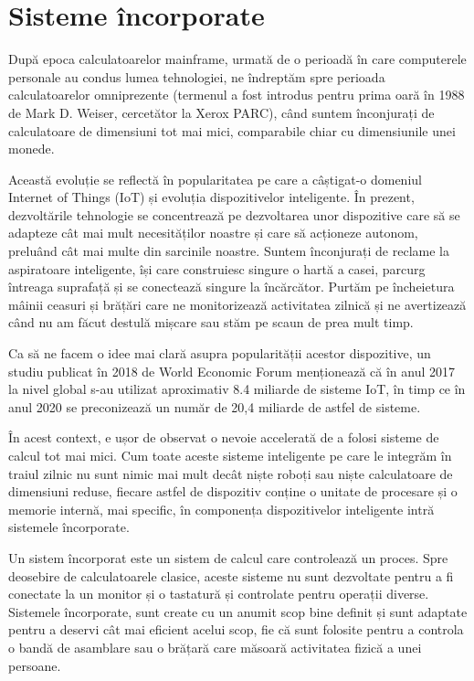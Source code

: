 \chapter{Sisteme încorporate}
\label{chapter:embed}

După epoca calculatoarelor mainframe, urmată de o perioadă în care computerele
personale au condus lumea tehnologiei, ne îndreptăm spre perioada
calculatoarelor omniprezente (termenul a fost introdus pentru prima oară în 1988
de Mark D. Weiser, cercetător la Xerox PARC), când suntem înconjurați de
calculatoare de dimensiuni tot mai mici, comparabile chiar cu dimensiunile unei
monede.

Această evoluție se reflectă în popularitatea pe care a câștigat-o domeniul
Internet of Things (IoT) și evoluția dispozitivelor inteligente. În prezent,
dezvoltările tehnologie se concentrează pe dezvoltarea unor dispozitive care să
se adapteze cât mai mult necesităților noastre și care să acționeze autonom,
preluând cât mai multe din sarcinile noastre. Suntem înconjurați de reclame la
aspiratoare inteligente, își care construiesc singure o hartă a casei, parcurg
întreaga suprafață și se conectează singure la încărcător. Purtăm pe încheietura
mâinii ceasuri și brățări care ne monitorizează activitatea zilnică și ne
avertizează când nu am făcut destulă mișcare sau stăm pe scaun de prea mult
timp.

Ca să ne facem o idee mai clară asupra popularității acestor dispozitive, un
studiu publicat în 2018 de World Economic Forum menționează că în anul 2017 la
nivel global s-au utilizat aproximativ 8.4 miliarde de sisteme IoT, în timp ce
în anul 2020 se preconizează un număr de 20,4 miliarde de astfel de sisteme.

În acest context, e ușor de observat o nevoie accelerată de a folosi sisteme de
calcul tot mai mici. Cum toate aceste sisteme inteligente pe care le integrăm
în traiul zilnic nu sunt nimic mai mult decât niște roboți sau niște
calculatoare de dimensiuni reduse, fiecare astfel de dispozitiv conține o
unitate de procesare și o memorie internă, mai specific, în componența
dispozitivelor inteligente intră sistemele încorporate.

Un sistem încorporat este un sistem de calcul care controlează un proces. Spre
deosebire de calculatoarele clasice, aceste sisteme nu sunt dezvoltate pentru a
fi conectate la un monitor și o tastatură și controlate pentru operații diverse.
Sistemele încorporate, sunt create cu un anumit scop bine definit și sunt
adaptate pentru a deservi cât mai eficient acelui scop, fie că sunt folosite
pentru a controla o bandă de asamblare sau o brățară care măsoară activitatea
fizică a unei persoane.


